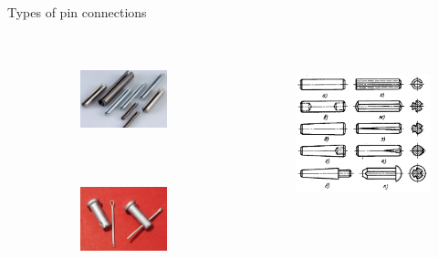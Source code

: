\documentclass[aspectratio=169]{beamer}
\begin{document}
\begin{frame}[t]{Types of pin connections}
\begin{columns}[T,onlytextwidth]
\begin{column}{0.69\textwidth}
\begin{figure}[H]
                \begin{subfigure}{0.49\textwidth}
                    \centering\includegraphics[height=3cm,width=1\textwidth,keepaspectratio]{pin_3.png}
                    \label{fig:pin_3.png}
                \end{subfigure}
                \begin{subfigure}{0.49\textwidth}
                    \centering\includegraphics[height=3cm,width=1\textwidth,keepaspectratio]{pin_4.png}
                    \label{fig:pin_4.png}
                \end{subfigure}
            \end{figure}
        \end{column}
        \begin{column}{0.29\textwidth}
            \vspace{1cm}
            \begin{figure}[H]
                \centering\includegraphics[height=5cm,width=1\textwidth,keepaspectratio]{types_of_pin.png}
                \label{fig:types_of_pin.png}
            \end{figure}
        \end{column}
    \end{columns}
\end{frame}
\end{document}

